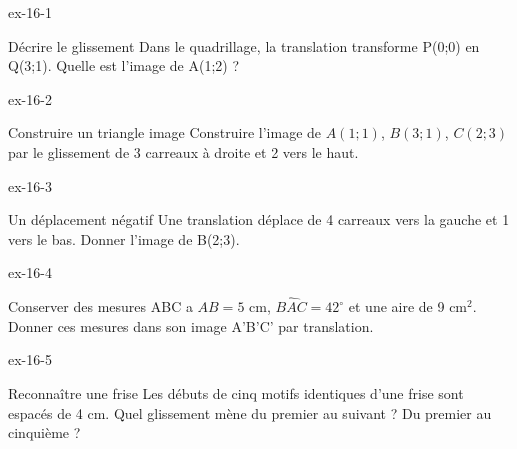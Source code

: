 \clearpage{}
\begin{blocLivre}{ex-16-1}\begin{exercice}[1]{Décrire le glissement}
Dans le quadrillage, la translation transforme P(0;0) en Q(3;1). Quelle est l’image de A(1;2) ?
\label{fig-ex-16-1}
\end{exercice}\end{blocLivre}
\begin{blocLivre}{ex-16-2}\begin{exercice}[1]{Construire un triangle image}
Construire l’image de $A(1;1)$, $B(3;1)$, $C(2;3)$ par le glissement de 3 carreaux à droite et 2 vers le haut.
\label{fig-ex-16-2}
\end{exercice}\end{blocLivre}
\begin{blocLivre}{ex-16-3}\begin{exercice}[1]{Un déplacement négatif}
Une translation déplace de 4 carreaux vers la gauche et 1 vers le bas. Donner l’image de B(2;3).
\label{fig-ex-16-3}
\end{exercice}\end{blocLivre}
\begin{blocLivre}{ex-16-4}\begin{exercice}[1]{Conserver des mesures}
ABC a $AB=5$ cm, $\widehat{BAC}=42^\circ$ et une aire de 9 cm$^2$. Donner ces mesures dans son image A’B’C’ par translation.
\label{fig-ex-16-4}
\end{exercice}\end{blocLivre}
\begin{blocLivre}{ex-16-5}\begin{exercice}[1]{Reconnaître une frise}
Les débuts de cinq motifs identiques d’une frise sont espacés de 4 cm. Quel glissement mène du premier au suivant ? Du premier au cinquième ?
\label{fig-ex-16-5}
\end{exercice}\end{blocLivre}

